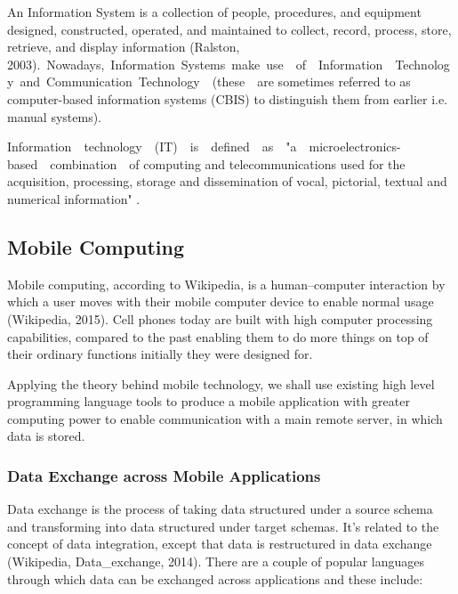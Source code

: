 \documentclass[12pt]{article}
\begin{document}
An Information System is a collection of people, procedures, and equipment designed, constructed, operated, and maintained to collect, record, process, store, retrieve, and display information  (Ralston, 2003).\ Nowadays,\ Information\ Systems\ make\ use\ \ of\ \ Information\ \ Technology\ and\ Communication\ Technology\ \ (these\ \ are  sometimes  referred  to  as  computer-based information  systems  (CBIS)  to  distinguish  them  from  earlier  i.e. manual systems).\par

Information\ \ technology\ \ (IT)\ \ is\ \ defined\ \ as\ \ "a\ \ microelectronics-based\ \ combination\ \ of computing  and  telecommunications  used  for  the  acquisition,  processing,  storage  and dissemination of vocal, pictorial, textual and numerical information" .\par

\setlength{\parskip}{3.0pt}
\subsection*{Mobile Computing}
\setlength{\parskip}{8.04pt}
Mobile computing, according to Wikipedia, is a human–computer interaction by which a user moves with their mobile computer device to enable normal usage (Wikipedia, 2015). Cell phones today are built with high computer processing capabilities, compared to the past enabling them to do more things on top of their ordinary functions initially they were designed for. \par

Applying the theory behind mobile technology, we shall use existing high level programming language tools to produce a mobile application with greater computing power to enable communication with a main remote server, in which data is stored.\par

\subsubsection*{Data Exchange across Mobile Applications}
Data exchange is the process of taking data structured under a source schema and transforming into data structured under target schemas. It’s related to the concept of data integration, except that data is restructured in data exchange  (Wikipedia, Data\_exchange, 2014). There are a couple of popular languages through which data can be exchanged across applications and these include: \par
\end{document}
